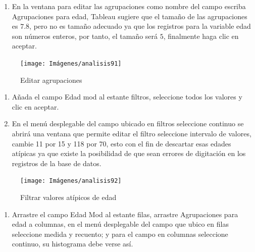 \documentclass[
]{book}
\providecommand{\tightlist}{%
  \setlength{\itemsep}{0pt}\setlength{\parskip}{0pt}}
\begin{document}
\begin{enumerate}
\def\labelenumi{\arabic{enumi}.}
\setcounter{enumi}{2}
\tightlist
\item
  En la ventana para editar las agrupaciones como nombre del campo escriba Agrupaciones para edad, Tableau sugiere que el tamaño de las agrupaciones es \(7.8\), pero no es tamaño adecuado ya que los registros para la variable edad son números enteros, por tanto, el tamaño será \(5\), finalmente haga clic en aceptar.
\end{enumerate}

\begin{figure}

{\centering \texttt{[image: Imágenes/analisis91]} 

}

\caption{Editar agrupaciones}\label{fig:paso3histograma-fig}
\end{figure}

\begin{enumerate}
\def\labelenumi{\arabic{enumi}.}
\setcounter{enumi}{3}
\item
  Añada el campo Edad mod al estante filtros, seleccione todos los valores y clic en aceptar.
\item
  En el menú desplegable del campo ubicado en filtros seleccione continuo se abrirá una ventana que permite editar el filtro seleccione intervalo de valores, cambie 11 por 15 y 118 por 70, esto con el fin de descartar esas edades atípicas ya que existe la posibilidad de que sean errores de digitación en los registros de la base de datos.
\end{enumerate}

\begin{figure}

{\centering \texttt{[image: Imágenes/analisis92]} 

}

\caption{Filtrar valores atípicos de edad}\label{fig:paso5histograma-fig}
\end{figure}

\begin{enumerate}
\def\labelenumi{\arabic{enumi}.}
\setcounter{enumi}{5}
\tightlist
\item
  Arrastre el campo Edad Mod al estante filas, arrastre Agrupaciones para edad a columnas, en el menú desplegable del campo que ubico en filas seleccione medida y recuento; y para el campo en columnas seleccione continuo, su histograma debe verse así.
\end{enumerate}
\end{document}
